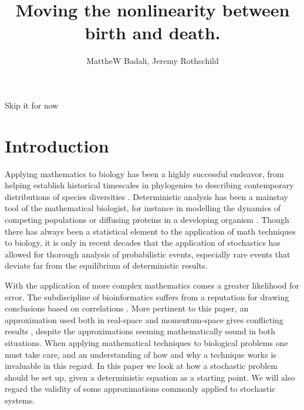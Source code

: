 \documentclass[a4paper,10pt]{article}
\title{Moving the nonlinearity between birth and death.}
\author{MattheW Badali, Jeremy Rothschild}
\numberwithin{equation}{section} %
\begin{document}
\maketitle

Skip it for now

\section{Introduction} \label{Introduction}%
Applying mathematics to biology has been a highly successful endeavor, from helping establish historical timescales in phylogenies to describing contemporary distributions of species diversities \cite{Hubbell2001}. %
Deterministic analysis has been a mainstay tool of the mathematical biologist, for instance in modelling the dynamics of competing populations \cite{Chesson1990} or diffusing proteins in a developing organism \cite{Maini2004}. 
Though there has always been a statistical element to the application of math techniques to biology, it is only in recent decades that the application of stochastics has allowed for thorough analysis of probabilistic events, especially rare events that deviate far from the equilibrium of deterministic results. 

With the application of more complex mathematics comes a greater likelihood for error. 
The subdiscipline of bioinformatics suffers from a reputation for drawing conclusions based on correlations \cite{}. %
More pertinent to this paper, an approximation used both in real-space and momentum-space gives conflicting results \cite{Ovaskainen2010}, despite the approximations seeming mathematically sound in both situations. 
When applying mathematical techniques to biological problems one must take care, and an understanding of how and why a technique works is invaluable in this regard. 
In this paper we look at how a stochastic problem should be set up, given a deterministic equation as a starting point. 
We will also regard the validity of some approximations commonly applied to stochastic systems. 
\end{document}
